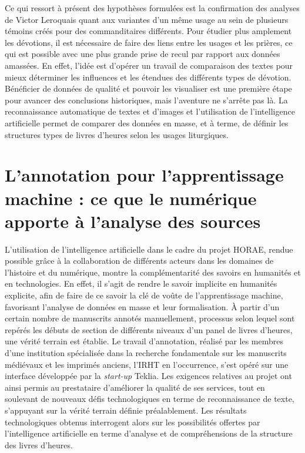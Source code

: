 \documentclass[a4paper,12pt,twoside]{book}
\begin{document}
Ce qui ressort à présent des hypothèses formulées est la confirmation des analyses de Victor Leroquais quant aux variantes d'un même usage au sein de plusieurs témoins créés pour des commanditaires différents. Pour étudier plus amplement les dévotions, il est nécessaire de faire des liens entre les usages et les prières, ce qui est possible avec une plus grande prise de recul par rapport aux données amassées. En effet, l'idée est d'opérer un travail de comparaison des textes pour mieux déterminer les influences et les étendues des différents types de dévotion. \\

Bénéficier de données de qualité et pouvoir les visualiser est une première étape pour avancer des conclusions historiques, mais l’aventure ne s’arrête pas là. La reconnaissance automatique de textes et d’images et l'utilisation de l'intelligence artificielle permet de comparer des données en masse, et à terme, de définir les structures types de livres d’heures selon les usages liturgiques.

	
	\chapter{\label{ML}L’annotation pour l’apprentissage machine : ce que le numérique apporte à l’analyse des sources}
	
	L'utilisation de l'intelligence artificielle dans le cadre du projet HORAE, rendue possible grâce à la collaboration de différents acteurs dans les domaines de l'histoire et du numérique, montre la complémentarité des savoirs en humanités et en technologies. En effet,  il s'agit de rendre le savoir implicite en humanités explicite, afin de faire de ce savoir la clé de voûte de l'apprentissage machine, favorisant l'analyse de données en masse et leur formalisation. À partir d'un certain nombre de manuscrits annotés manuellement, processus selon lequel sont repérés les débuts de section de différents niveaux d'un panel de livres d'heures, une vérité terrain est établie. Le travail d'annotation, réalisé par les membres d'une institution spécialisée dans la recherche fondamentale sur les manuscrits médiévaux et les imprimés anciens, l'IRHT en l'occurrence, s'est opéré sur une interface développée par la \textit{start-up} Teklia. Les exigences relatives au projet ont ainsi permis au prestataire d'améliorer la qualité de ses services, tout en soulevant de nouveaux défis technologiques en terme de reconnaissance de texte, s'appuyant sur la vérité terrain définie préalablement. Les résultats technologiques obtenus interrogent alors sur les possibilités offertes par l'intelligence artificielle en terme d'analyse et de compréhensions de la structure des livres d'heures.
	
\end{document}
